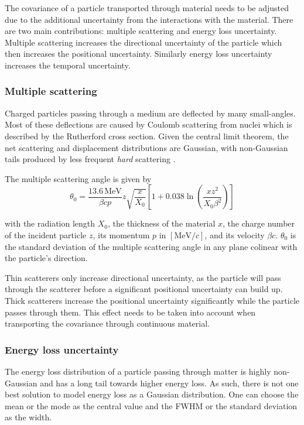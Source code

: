 The covariance of a particle transported through material needs to be adjusted due to the additional uncertainty from the interactions with the material. There are two main contributions: multiple scattering and energy loss uncertainty. Multiple scattering increases the directional uncertainty of the particle which then increases the positional uncertainty. Similarly energy loss uncertainty increases the temporal uncertainty.

\subsubsection{Multiple scattering}

Charged particles passing through a medium are deflected by many small-angles. Most of these deflections are caused by Coulomb scattering from nuclei which is described by the Rutherford cross section. Given the central limit theorem, the net scattering and displacement distributions are Gaussian, with non-Gaussian tails produced by less frequent \textit{hard} scattering \cite{pdg2024}.

The multiple scattering angle is given by \cite{pdg2024}
\begin{equation}
    \theta_0 = \frac{13.6 \, \text{MeV}}{\beta c p} z \sqrt{\frac{x}{X_0}} \left[ 1 + 0.038 \ln \left( \frac{x z^2}{X_0 \beta^2} \right) \right]
    \label{eq:dev/dense/msc}
\end{equation}

with the radiation length $X_0$, the thickness of the material $x$, the charge number of the incident particle $z$, its momentum $p$ in $[\text{MeV}/c]$, and its velocity $\beta c$. $\theta_0$ is the standard deviation of the multiple scattering angle in any plane colinear with the particle's direction.

Thin scatterers only increase directional uncertainty, as the particle will pass through the scatterer before a significant positional uncertainty can build up. Thick scatterers increase the positional uncertainty significantly while the particle passes through them. This effect needs to be taken into account when transporting the covariance through continuous material.

\subsubsection{Energy loss uncertainty}

The energy loss distribution of a particle passing through matter is highly non-Gaussian and has a long tail towards higher energy loss. As such, there is not one best solution to model energy loss as a Gaussian distribution. One can choose the mean or the mode as the central value and the FWHM or the standard deviation as the width.

